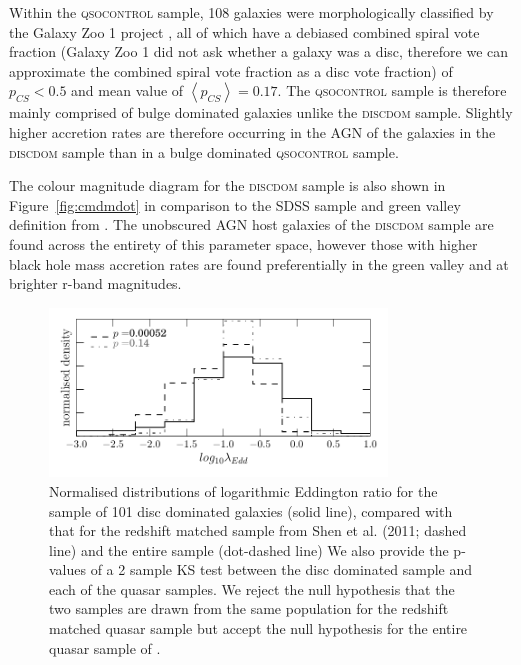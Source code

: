 {Within the \textsc{qsocontrol} sample, 108 galaxies were morphologically classified by the Galaxy Zoo 1 project \cite{lintott08, Lintott11}, all of which have a debiased combined spiral vote fraction (Galaxy Zoo 1 did not ask whether a galaxy was a disc, therefore we can approximate the combined spiral vote fraction as a disc vote fraction) of $p_{CS} < 0.5$ and mean value of $\left<p_{CS} \right> = 0.17$.  The \textsc{qsocontrol} sample is therefore mainly comprised of bulge dominated galaxies unlike the \textsc{discdom} sample. Slightly higher accretion rates are therefore occurring in the AGN of the galaxies in the \textsc{discdom} sample than in a bulge dominated \textsc{qsocontrol} sample. 

The colour magnitude diagram for the \textsc{discdom} sample is also shown in Figure~\ref{fig:cmdmdot} in comparison to the SDSS sample and green valley definition from \citet{Baldry04}. The unobscured AGN host galaxies of the \textsc{discdom} sample are found across the entirety of this parameter space, however those with higher black hole mass accretion rates are found preferentially in the green valley and at brighter r-band magnitudes. 


\begin{figure}
\centering
\includegraphics[width=0.8\textwidth]{agn/edd_ratio_z_matched_shen_2011_compare.pdf}
\caption[Eddington ratio distribution of the bulgeless AGN sample]{Normalised distributions of logarithmic Eddington ratio for the sample of 101 disc dominated galaxies (solid line), compared with that for the redshift matched sample from Shen et al. (2011; dashed line) and the entire sample (dot-dashed line) We also provide the p-values of a 2 sample KS test between the disc dominated sample and each of the quasar samples. We reject the null hypothesis that the two samples are drawn from the same population for the redshift matched quasar sample but accept the null hypothesis for the entire quasar sample of \citet{shen11}.  
}
\label{fig:eddratioshen}
\end{figure}


}
